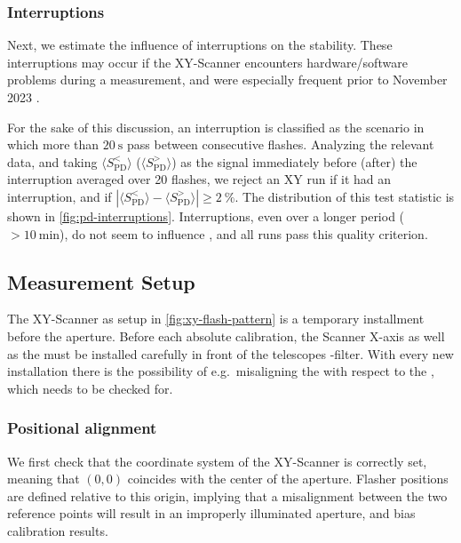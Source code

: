 \subsubsection{Interruptions}

Next, we estimate the influence of \DAQ interruptions on the \CLS stability.
These interruptions may occur if the XY-Scanner encounters hardware/software
problems during a measurement, and were especially frequent prior to November 
2023 \cite{filipFixfilespy2023}.

For the sake of this discussion, an interruption is classified as the scenario
in which more than $\SI{20}{\second}$ pass between consecutive flashes. 
Analyzing the relevant data, and taking $\langle S^{<}_\mathrm{PD}\rangle$ 
($\langle S^{>}_\mathrm{PD}\rangle$) as the signal immediately before (after) 
the \DAQ interruption averaged over 20 flashes, we reject an XY run if it had an
interruption, and if $\left| \langle S^{<}_\mathrm{PD}\rangle - \langle 
S^{>}_\mathrm{PD}\rangle\right| \geq \SI{2}{\percent}$. The distribution of this
test statistic is shown in \cref{fig:pd-interruptions}. Interruptions, even over
a longer period ($>\SI{10}{\minute}$), do not seem to influence \DAQ, and all
runs pass this quality criterion.

\subsection{Measurement Setup}

The XY-Scanner as setup in \cref{fig:xy-flash-pattern} is a temporary 
installment before the \FD aperture. Before each absolute calibration, the 
Scanner X-axis as well as the \CLS must be installed carefully in front of the
telescopes \UV-filter. With every new installation there is the possibility of 
e.g.~misaligning the \CLS with respect to the \FD, which needs to be checked 
for.

\subsubsection{Positional alignment}
\label{sssec:xy-qa-filter-estimation}

We first check that the coordinate system of the XY-Scanner is correctly set,
meaning that $(0, 0)$ coincides with the center of the \FD aperture. Flasher 
positions are defined relative to this origin, implying that a misalignment 
between the two reference points will result in an improperly illuminated 
aperture, and bias calibration results.

